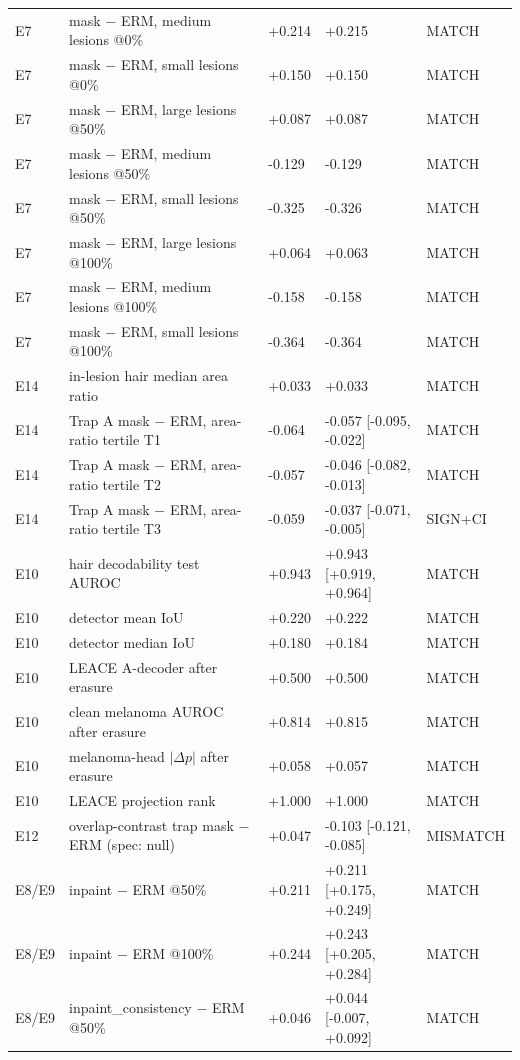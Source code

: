 {\begin{longtable}{llp{1.7cm}p{3.3cm}l}
E7 & mask $-$ ERM, medium lesions @0\% & +0.214 & +0.215 & MATCH \\
E7 & mask $-$ ERM, small lesions @0\% & +0.150 & +0.150 & MATCH \\
E7 & mask $-$ ERM, large lesions @50\% & +0.087 & +0.087 & MATCH \\
E7 & mask $-$ ERM, medium lesions @50\% & -0.129 & -0.129 & MATCH \\
E7 & mask $-$ ERM, small lesions @50\% & -0.325 & -0.326 & MATCH \\
E7 & mask $-$ ERM, large lesions @100\% & +0.064 & +0.063 & MATCH \\
E7 & mask $-$ ERM, medium lesions @100\% & -0.158 & -0.158 & MATCH \\
E7 & mask $-$ ERM, small lesions @100\% & -0.364 & -0.364 & MATCH \\
E14 & in-lesion hair median area ratio & +0.033 & +0.033 & MATCH \\
E14 & Trap A mask $-$ ERM, area-ratio tertile T1 & -0.064 & -0.057 [-0.095, -0.022] & MATCH \\
E14 & Trap A mask $-$ ERM, area-ratio tertile T2 & -0.057 & -0.046 [-0.082, -0.013] & MATCH \\
E14 & Trap A mask $-$ ERM, area-ratio tertile T3 & -0.059 & -0.037 [-0.071, -0.005] & SIGN+CI \\
E10 & hair decodability test AUROC & +0.943 & +0.943 [+0.919, +0.964] & MATCH \\
E10 & detector mean IoU & +0.220 & +0.222 & MATCH \\
E10 & detector median IoU & +0.180 & +0.184 & MATCH \\
E10 & LEACE A-decoder after erasure & +0.500 & +0.500 & MATCH \\
E10 & clean melanoma AUROC after erasure & +0.814 & +0.815 & MATCH \\
E10 & melanoma-head $|\Delta p|$ after erasure & +0.058 & +0.057 & MATCH \\
E10 & LEACE projection rank & +1.000 & +1.000 & MATCH \\
E12 & overlap-contrast trap mask $-$ ERM (spec: null) & +0.047 & -0.103 [-0.121, -0.085] & MISMATCH \\
E8/E9 & inpaint $-$ ERM @50\% & +0.211 & +0.211 [+0.175, +0.249] & MATCH \\
E8/E9 & inpaint $-$ ERM @100\% & +0.244 & +0.243 [+0.205, +0.284] & MATCH \\
E8/E9 & inpaint\_consistency $-$ ERM @50\% & +0.046 & +0.044 [-0.007, +0.092] & MATCH \\

\end{longtable}}
